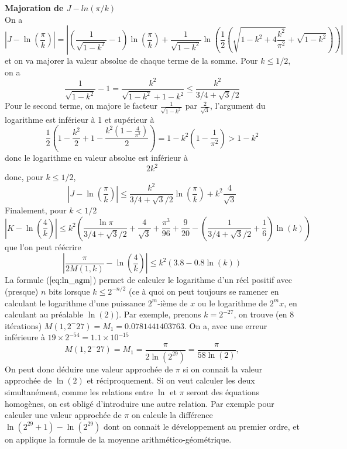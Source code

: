 \documentclass[a4paper,11pt]{article}
\begin{document}
\begin{giacjshere}
{\bf Majoration de $J-ln(\pi/k)$}\\
On a
\[ |J - \ln\left(\frac{\pi}{k}\right)|
= \left| (\frac{1}{\sqrt{1-k^2}}-1) \ln\left(\frac{\pi}{k}\right)
+ \frac{1}{\sqrt{1-k^2}}
\ln\left( \frac{1}{2} \left(\sqrt{ 1-k^{2} +4 \frac{k^{2}}{\pi^2}} 
+\sqrt{1-k^{2}} \right) \right) \right| \]
et on va majorer la valeur absolue de chaque terme de la somme.
Pour $k\leq 1/2$, on a
\[ \frac{1}{\sqrt{1-k^2}}-1=\frac{k^2}{\sqrt{1-k^2}+1-k^2} \leq \frac{k^2}{3/4+\sqrt{3}/2} \]
Pour le second terme, on majore le facteur $\frac{1}{\sqrt{1-k^2}}$ par $\frac{2}{\sqrt{3}}$,
l'argument du logarithme est inférieur à 1 et supérieur à
\[ 
\frac{1}{2}(1 - \frac{k^2}{2} +1- \frac{k^2(1-\frac{4}{\pi^2})}{2})
= 1 - k^2 ( 1-\frac{1}{\pi^2}) > 1-k^2
\]
donc le logarithme en valeur absolue est inférieur à
\[ 2 k^2 \]
donc, pour $k\leq 1/2$,
\[ |J-\ln\left(\frac{\pi}{k}\right)| \leq 
\frac{k^2}{3/4+\sqrt{3}/2} \ln\left(\frac{\pi}{k}\right)
+ k^2 \frac{4}{\sqrt{3}} 
\]
Finalement, pour $k<1/2$
\begin{equation} \label{eq:ln_agm0}
 |K-\ln\left(\frac{4}{k}\right) | 
\leq k^2 \left( \frac{\ln \pi}{3/4+\sqrt{3}/2}  + \frac{4}{\sqrt{3} }
+ \frac{\pi^3}{96} + \frac{9}{20}
- (\frac{1}{3/4+\sqrt{3}/2}+\frac{1}{6}) \ln(k) \right) 
\end{equation}
que l'on peut réécrire
\begin{equation} \label{eq:ln_agm}
|\frac{\pi}{2M(1,k)}-\ln\left(\frac{4}{k}\right) |
\leq  k^2(3.8-0.8\ln(k))
\end{equation}
La formule (\(\ref{eq:ln_agm}\)) 
permet de calculer le logarithme d'un r\'eel positif
avec (presque) $n$ bits 
lorsque $k \leq 2^{-n/2}$ (ce \`a quoi on peut toujours se ramener
en calculant le logarithme d'une puissance $2^m$-i\`eme de $x$ ou
le logarithme de $2^{m}x$, en calculant au pr\'ealable $\ln(2)$).
Par exemple, prenons $k=2^{-27}$, on trouve (en 8 itérations)
$M(1,2^-{27})=M_1=0.0781441403763$. 
On a, avec une erreur inférieure à $19 \times 2^{-54}=1.1\times 10^{-15}$
\[ 
M(1,2^-{27})=M_1=\frac{\pi}{2\ln(2^{29})}=\frac{\pi}{58\ln(2)},
\] 
On peut donc d\'eduire une valeur approch\'ee de $\pi $ si on connait
la valeur approchée de $\ln(2)$ et réciproquement.
Si on veut calculer les deux simultan\'ement, comme les relations entre $\ln$
et $\pi$ seront des \'equations homog\`enes, on est oblig\'e
d'introduire une autre relation. Par exemple pour calculer une
valeur approch\'ee de $\pi$ on calcule la diff\'erence
$\ln(2^{29}+1)-\ln(2^{29})$ dont on connait le d\'eveloppement au premier
ordre, et on applique la formule de la moyenne arithm\'etico-g\'eom\'etrique.

\end{giacjshere}
\end{document}
